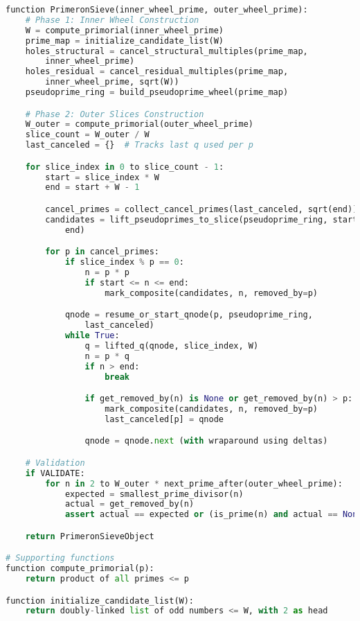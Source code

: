 \begin{lstlisting}[language=Python, basicstyle=\ttfamily\footnotesize, frame=single]
function PrimeronSieve(inner_wheel_prime, outer_wheel_prime):
    # Phase 1: Inner Wheel Construction
    W = compute_primorial(inner_wheel_prime)
    prime_map = initialize_candidate_list(W)
    holes_structural = cancel_structural_multiples(prime_map,
        inner_wheel_prime)
    holes_residual = cancel_residual_multiples(prime_map,
        inner_wheel_prime, sqrt(W))
    pseudoprime_ring = build_pseudoprime_wheel(prime_map)

    # Phase 2: Outer Slices Construction
    W_outer = compute_primorial(outer_wheel_prime)
    slice_count = W_outer / W
    last_canceled = {}  # Tracks last q used per p

    for slice_index in 0 to slice_count - 1:
        start = slice_index * W
        end = start + W - 1

        cancel_primes = collect_cancel_primes(last_canceled, sqrt(end))
        candidates = lift_pseudoprimes_to_slice(pseudoprime_ring, start,
            end)

        for p in cancel_primes:
            if slice_index % p == 0:
                n = p * p
                if start <= n <= end:
                    mark_composite(candidates, n, removed_by=p)

            qnode = resume_or_start_qnode(p, pseudoprime_ring,
                last_canceled)
            while True:
                q = lifted_q(qnode, slice_index, W)
                n = p * q
                if n > end:
                    break

                if get_removed_by(n) is None or get_removed_by(n) > p:
                    mark_composite(candidates, n, removed_by=p)
                    last_canceled[p] = qnode

                qnode = qnode.next (with wraparound using deltas)

    # Validation
    if VALIDATE:
        for n in 2 to W_outer * next_prime_after(outer_wheel_prime):
            expected = smallest_prime_divisor(n)
            actual = get_removed_by(n)
            assert actual == expected or (is_prime(n) and actual == None)

    return PrimeronSieveObject

# Supporting functions
function compute_primorial(p):
    return product of all primes <= p

function initialize_candidate_list(W):
    return doubly-linked list of odd numbers <= W, with 2 as head


\end{lstlisting}
